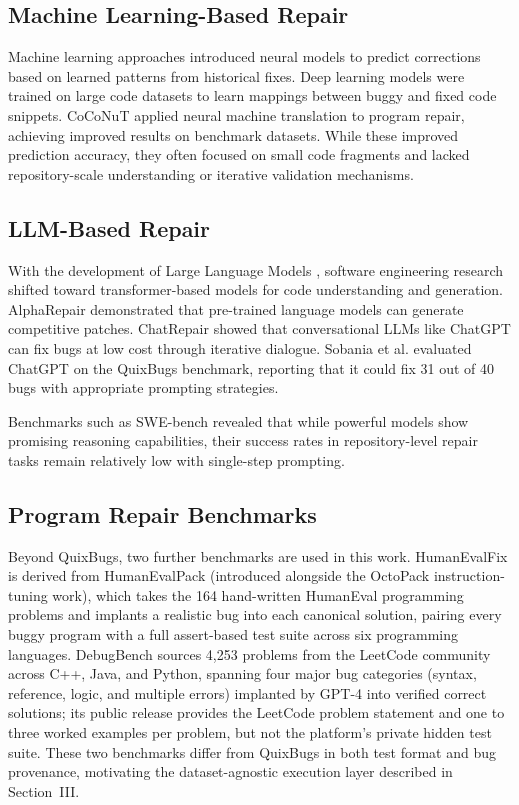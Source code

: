 \documentclass[conference]{IEEEtran}
\begin{document}
\subsection{Machine Learning-Based Repair}
Machine learning approaches introduced neural models to predict corrections based on learned patterns from historical fixes. Deep learning models were trained on large code datasets to learn mappings between buggy and fixed code snippets. CoCoNuT \cite{coconut} applied neural machine translation to program repair, achieving improved results on benchmark datasets. While these improved prediction accuracy, they often focused on small code fragments and lacked repository-scale understanding or iterative validation mechanisms.

\subsection{LLM-Based Repair}
With the development of Large Language Models \cite{transformer, codex}, software engineering research shifted toward transformer-based models for code understanding and generation. AlphaRepair \cite{alpharepair} demonstrated that pre-trained language models can generate competitive patches. ChatRepair \cite{chatrepair} showed that conversational LLMs like ChatGPT can fix bugs at low cost through iterative dialogue. Sobania et al. \cite{chatgptapr} evaluated ChatGPT on the QuixBugs benchmark, reporting that it could fix 31 out of 40 bugs with appropriate prompting strategies.

Benchmarks such as SWE-bench \cite{swebench} revealed that while powerful models show promising reasoning capabilities, their success rates in repository-level repair tasks remain relatively low with single-step prompting.

\subsection{Program Repair Benchmarks}
Beyond QuixBugs, two further benchmarks are used in this work. HumanEvalFix \cite{humanevalpack} is derived from HumanEvalPack (introduced alongside the OctoPack instruction-tuning work), which takes the 164 hand-written HumanEval \cite{codex} programming problems and implants a realistic bug into each canonical solution, pairing every buggy program with a full assert-based test suite across six programming languages. DebugBench \cite{debugbench} sources 4{,}253 problems from the LeetCode community across C++, Java, and Python, spanning four major bug categories (syntax, reference, logic, and multiple errors) implanted by GPT-4 into verified correct solutions; its public release provides the LeetCode problem statement and one to three worked examples per problem, but not the platform's private hidden test suite. These two benchmarks differ from QuixBugs in both test format and bug provenance, motivating the dataset-agnostic execution layer described in Section~III.
\end{document}
